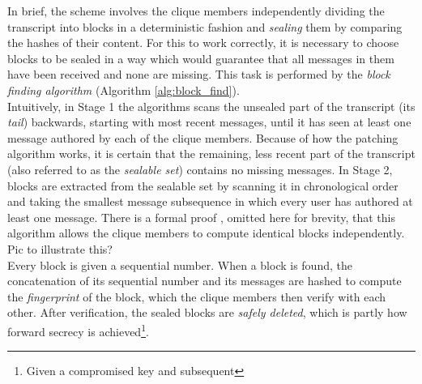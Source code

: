 \documentclass[a4paper, 12pt]{report}
\begin{document}
In brief, the scheme involves the clique members independently dividing the transcript into blocks in a deterministic fashion and \emph{sealing} them by comparing the hashes of their content. For this to work correctly, it is necessary to choose blocks to be sealed in a way which would guarantee that all messages in them have been received and none are missing. This task is performed by the \emph{block finding algorithm} (Algorithm \ref{alg:block_find}). \\

Intuitively, in Stage 1 the algorithms scans the unsealed part of the transcript (its \emph{tail}) backwards, starting with most recent messages, until it has seen at least one message authored by each of the clique members. Because of how the patching algorithm works, it is certain that the remaining, less recent part of the transcript (also referred to as the \emph{sealable set}) contains no missing messages. In Stage 2, blocks are extracted from the sealable set by scanning it in chronological order and taking the smallest message subsequence in which every user has authored at least one message. There is a formal proof \cite{reardon2007kleeq}, omitted here for brevity, that this algorithm allows the clique members to compute identical blocks independently. {\color{red} Pic to illustrate this?}\\

Every block is given a sequential number. When a block is found, the concatenation of its sequential number and its messages are hashed to compute the \emph{fingerprint} of the block, which the clique members then verify with each other. After verification, the sealed blocks are \emph{safely deleted}, which is partly how forward secrecy is achieved\footnote{Given a compromised key and subsequent }.
\end{document}
